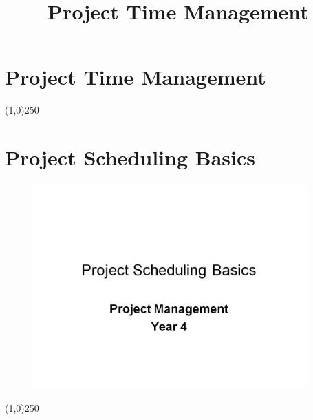 




\title[Project Management]{Project Time Management}



%
\usetikzlibrary{arrows}



\section{Project Time Management}



\tableofcontents
\newpage



\begin{frame}
\titlepage
\end{frame}
\begin{center}\line(1,0){250}\end{center}
%
%

\section{Project Scheduling Basics}


\begin{frame}
\begin{figure}
	\centering
		\includegraphics[width = 10.5cm]{oldnotes/Slide32.jpg}
\end{figure}
\end{frame}
\begin{center}\line(1,0){250}\end{center}



